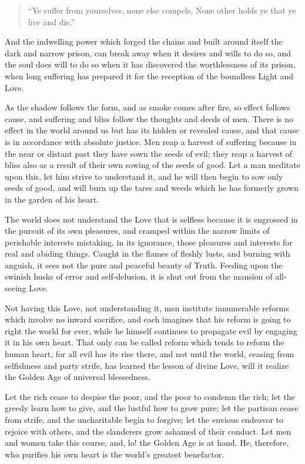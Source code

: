 \documentclass[12pt,oneside]{scrbook}
\begin{document}
  \begin{quote}
  ``Ye suffer from yourselves, none else compels, None other holds ye that
  ye live and die.''
  \end{quote}
  
  And the indwelling power which forged the chains and built around itself
  the dark and narrow prison, can break away when it desires and wills to
  do so, and the soul does will to do so when it has discovered the
  worthlessness of its prison, when long suffering has prepared it for the
  reception of the boundless Light and Love.
  
  As the shadow follows the form, and as smoke comes after fire, so effect
  follows cause, and suffering and bliss follow the thoughts and deeds of
  men. There is no effect in the world around us but has its hidden or
  revealed cause, and that cause is in accordance with absolute justice.
  Men reap a harvest of suffering because in the near or distant past they
  have sown the seeds of evil; they reap a harvest of bliss also as a
  result of their own sowing of the seeds of good. Let a man meditate upon
  this, let him strive to understand it, and he will then begin to sow
  only seeds of good, and will burn up the tares and weeds which he has
  formerly grown in the garden of his heart.
  
  The world does not understand the Love that is selfless because it is
  engrossed in the pursuit of its own pleasures, and cramped within the
  narrow limits of perishable interests mistaking, in its ignorance, those
  pleasures and interests for real and abiding things. Caught in the
  flames of fleshly lusts, and burning with anguish, it sees not the pure
  and peaceful beauty of Truth. Feeding upon the swinish husks of error
  and self-delusion, it is shut out from the mansion of all-seeing Love.
  
  Not having this Love, not understanding it, men institute innumerable
  reforms which involve no inward sacrifice, and each imagines that his
  reform is going to right the world for ever, while he himself continues
  to propagate evil by engaging it in his own heart. That only can be
  called reform which tends to reform the human heart, for all evil has
  its rise there, and not until the world, ceasing from selfishness and
  party strife, has learned the lesson of divine Love, will it realize the
  Golden Age of universal blessedness.
  
  Let the rich cease to despise the poor, and the poor to condemn the
  rich; let the greedy learn how to give, and the lustful how to grow
  pure; let the partisan cease from strife, and the uncharitable begin to
  forgive; let the envious endeavor to rejoice with others, and the
  slanderers grow ashamed of their conduct. Let men and women take this
  course, and, lo! the Golden Age is at hand. He, therefore, who purifies
  his own heart is the world's greatest benefactor.
  
\end{document}
